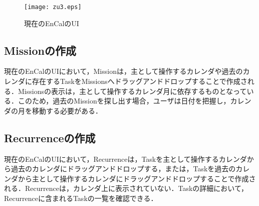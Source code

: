 \documentclass[fleqn, 14pt]{extarticlej}
\begin{document}
\begin{figure}[h]
  \begin{center}
    \texttt{[image: zu3.eps]}
    \caption{現在のEnCalのUI}
  \end{center}
\end{figure}

\subsection{Missionの作成}
現在のEnCalのUIにおいて，Missionは，主として操作するカレンダや過去のカレンダに存在するTaskをMissionsへドラッグアンドドロップすることで作成される．Missionsの表示は，主として操作するカレンダ月に依存するものとなっている．このため，過去のMissionを探し出す場合，ユーザは日付を把握し，カレンダの月を移動する必要がある．\\

\subsection{Recurrenceの作成}
現在のEnCalのUIにおいて，Recurrenceは，Taskを主として操作するカレンダから過去のカレンダにドラッグアンドドロップする，または，Taskを過去のカレンダから主として操作するカレンダにドラッグアンドドロップすることで作成される．Recurrenceは，カレンダ上に表示されていない．Taskの詳細において，Recurrenceに含まれるTaskの一覧を確認できる．\\

	
	
	
\end{document}
